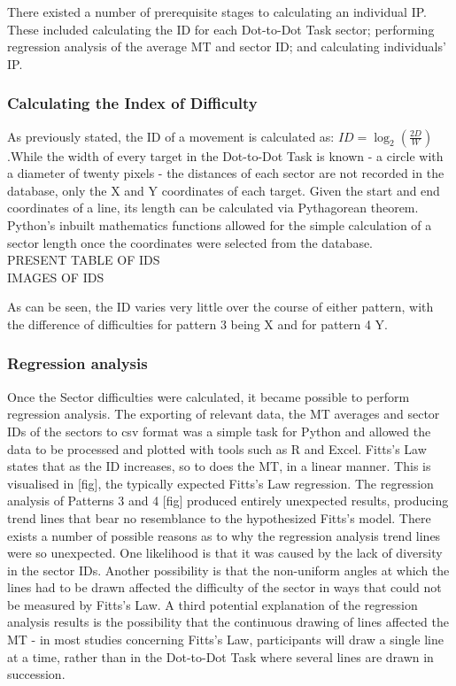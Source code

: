 		There existed a number of prerequisite stages to calculating an individual IP. These included calculating the ID for each Dot-to-Dot Task sector; performing regression analysis of the average MT and sector ID; and calculating individuals’ IP.
		
		\subsubsection{Calculating the Index of Difficulty}
			As previously stated, the ID of a movement is calculated as: \(ID = \log_2\left( \frac{2D}{W}\right)\).While the width of every target in the Dot-to-Dot Task is known -  a circle with a diameter of twenty pixels - the distances of each sector are not recorded in the database, only the X and Y coordinates of each target. Given the start and end coordinates of a line, its length can be calculated via Pythagorean theorem. Python’s inbuilt mathematics functions allowed for the simple calculation of a sector length once the coordinates were selected from the database.
			\\
			
			PRESENT TABLE OF IDS\\
			
			IMAGES OF IDS
			
			As can be seen, the ID varies very little over the course of either pattern, with the difference of difficulties for pattern 3 being  X and for pattern 4 Y.
			
		\subsubsection{Regression analysis}
			Once the Sector difficulties were calculated, it became possible to perform regression analysis. The exporting of relevant data, the MT averages and sector IDs of the sectors to csv format was a simple task for Python and allowed the data to be processed and plotted with tools such as R and Excel. 
			Fitts’s Law states that as the ID increases, so to does the MT, in a linear manner. This is visualised in [fig], the typically expected Fitts’s Law regression. The regression analysis of Patterns 3 and 4 [fig] produced entirely unexpected results, producing trend lines that bear no resemblance to the hypothesized Fitts’s model.
			There exists a number of possible reasons as to why the regression analysis trend lines were so unexpected. One likelihood is that it was caused by the lack of diversity in the sector IDs. Another possibility is that the non-uniform angles at which the lines had to be drawn affected the difficulty of the sector in ways that could not be measured by Fitts’s Law. A third potential explanation of the regression analysis results is the possibility that the continuous drawing of lines affected the MT - in most studies concerning Fitts’s Law, participants will draw a single line at a time, rather than in the Dot-to-Dot Task where several lines are drawn in succession. 
			
